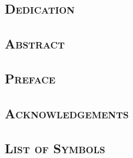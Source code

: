 \documentclass[a4paper,11pt,oneside,leqno,fleqn]{book} %
\theoremstyle{mythm}
\newcommand\blankpage{%
\null
\thispagestyle{empty}%
\newpage}
\def\biblio{}
\numberwithin{equation}{thm}
\begin{document}
\pagestyle{plain}

\def\biblio{}
\frontmatter

\clearpage
\setcounter{page}{1}

\doublespacing

\begin{center}\section*{\textsc{Dedication}}\end{center}

\cleartooddpage
{}
\begin{center}\section*{\textsc{Abstract}}\end{center}

\cleartooddpage
{}
\begin{center}\section*{\textsc{Preface}}\end{center}
\clearpage

\cleartooddpage
{}
\begin{center}\section*{\textsc{Acknowledgements}}\end{center}
\newpage
\blankpage

\singlespace

\cleartooddpage
\tableofcontents{}
\clearpage

\cleartooddpage
{}
\begin{center}\section*{\textsc{List of Symbols}}\end{center}
\clearpage
\end{document}
